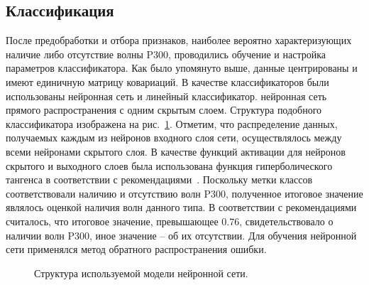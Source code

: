 \documentclass[12pt,a4paper,oneside,fleqn,leqno]{article}
\begin{document}
\subsection{Классификация}
	\par После предобработки и отбора признаков, наиболее вероятно характеризующих наличие либо отсутствие волны P300, проводились обучение и  настройка параметров классификатора. Как было упомянуто выше, данные центрированы и имеют единичную матрицу ковариаций. В качестве классификаторов были использованы нейронная сеть и линейный классификатор.
	 нейронная сеть прямого распространения с одним скрытым слоем. Структура подобного классификатора изображена на рис.~\ref{nn}. Отметим, что распределение данных, получаемых каждым из нейронов входного слоя сети, осуществлялось между всеми нейронами скрытого слоя. В качестве функций активации для нейронов скрытого и выходного слоев была использована функция гиперболического тангенса в соответствии с рекомендациями~\cite{activation}. Поскольку метки классов соответствовали наличию и отсутствию волн P300, полученное итоговое значение являлось оценкой наличия волн данного типа. В соответствии с рекомендациями~\cite{neu_net} считалось, что итоговое значение, превышающее 0.76, свидетельствовало о наличии волн P300, иное значение -- об их отсутствии. Для обучения нейронной сети применялся метод обратного распространения ошибки.
	\begin{figure}[h!]
		\caption{Структура используемой модели нейронной сети.}
	\label{nn}
	\end{figure}
\end{document}
